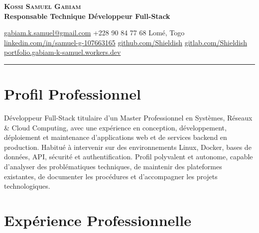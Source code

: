 \documentclass[11pt,a4paper]{article}
\begin{document}
\color{black}

\begin{center}

    {\Huge\bfseries\scshape Kossi Samuel Gabiam}\\[6pt]

    {\large\bfseries
    Responsable Technique \textbullet{} Développeur Full-Stack}\\[8pt]

    \small

    \href{mailto:gabiam.k.samuel@gmail.com}
    {gabiam.k.samuel@gmail.com}
    \quad\textbullet\quad
    +228 90 84 77 68
    \quad\textbullet\quad
    Lomé, Togo\\[3pt]

    \href{https://www.linkedin.com/in/samuel-g-107663165/}
    {linkedin.com/in/samuel-g-107663165}
    \quad\textbullet\quad
    \href{https://github.com/Shieldish}
    {github.com/Shieldish}
    \quad\textbullet\quad
    \href{https://gitlab.com/Shieldish}
    {gitlab.com/Shieldish}
    \quad\textbullet\quad
    \href{https://portfolio.gabiam-k-samuel.workers.dev/}
    {portfolio.gabiam-k-samuel.workers.dev}
\end{center}

\vspace{-2pt}
\noindent\rule{\linewidth}{1pt}
\vspace{6pt}

\section{Profil Professionnel}

Développeur Full-Stack titulaire d'un Master Professionnel en
Systèmes, Réseaux \& Cloud Computing, avec une expérience en
conception, développement, déploiement et maintenance d'applications
web et de services backend en production. Habitué à intervenir sur
des environnements Linux, Docker, bases de données, API, sécurité et
authentification. Profil polyvalent et autonome, capable d'analyser
des problématiques techniques, de maintenir des plateformes
existantes, de documenter les procédures et d'accompagner les projets
technologiques.

\section{Expérience Professionnelle}
\end{document}
